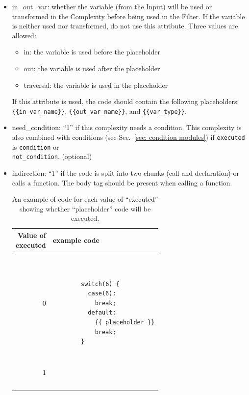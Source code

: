 \documentclass[12pt]{article}
\begin{document}
\begin{itemize}
    \item in\_out\_var: whether the variable (from the Input) will be used or
    transformed in the Complexity before being used in the Filter.  If the
    variable is neither used nor transformed, do not use this attribute.
    Three values are allowed:
    \begin{itemize}[nosep]
        \item in: the variable is used before the placeholder
        \item out: the variable is used after the placeholder
        \item traversal: the variable is used in the placeholder
    \end{itemize}
    If this attribute is used, the code should contain the following
    placeholders: \\
    \verb|{{in_var_name}}|, \verb|{{out_var_name}}|, and \verb|{{var_type}}|.

    \item need\_condition: ``1'' if this complexity needs a condition.
      This complexity is also combined with conditions (see
      Sec.~\ref{sec: condition modules}) if \verb|executed| is \verb|condition|
      or \\ \verb|not_condition|. (optional)

    \item indirection: ``1'' if the code is split into two chunks (call and
    declaration) or calls a function.  The body tag should be present when
    calling a function.

    \begin{table}[H]
    \centering
    \caption{An example of code for each value of ``executed'' showing whether
      ``placeholder'' code will be executed.}
    \begin{tabular}{|r|l|}
    \hline
      \makecell{Value of \\ executed}
      & example code \\
    \hline
    0 &
    \begin{minipage}{3in}
    \begin{verbatim}


        switch(6) {
          case(6):
            break;
          default:
            {{ placeholder }}
            break;
        }
    \end{verbatim}
    \end{minipage}
    \\
    \hline
    1 &
    \begin{minipage}{3in}
    \begin{verbatim}



\end{verbatim}
\end{minipage}
\end{tabular}
\end{table}
\end{itemize}
\end{document}
